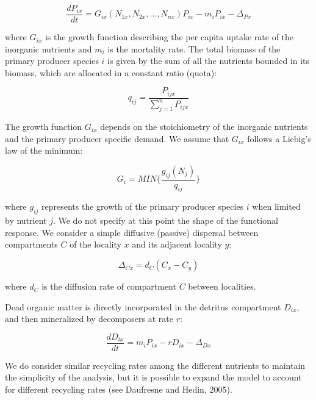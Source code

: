 \documentclass[letterpaper,twocolumn,showkeys]{revtex4-1}
\begin{document}
\begin{equation}
	\label{e:bnet}
	\frac{dP_{ix}}{dt}=G_{ix}(N_{1x},N_{2x},…,N_{nx})P_{ix}-m_{i}P_{ix}-\Delta_{Px}
\end{equation}

where $G_{ix}$ is the growth function describing the per capita uptake rate of the inorganic nutrients and $m_{i}$ is the mortality rate. The total biomass of the primary producer species $i$ is given by the sum of all the nutrients bounded in its biomass, which are allocated in a constant ratio (quota): 

\begin{equation}
	\label{e:bnet}
	q_{ij}=\frac{P_{ijx}}{\sum_{j=1}^{n}P_{ijx}}
\end{equation}

The growth function $G_{ix}$ depends on the stoichiometry of the inorganic nutrients and the primary producer specific demand. We assume that $G_{ix}$ follows a Liebig’s law of the minimum:

\begin{equation}
	\label{e:bnet}
	G_{i}=MIN\{\frac{g_{ij}(N_{j})}{q_{ij}}\}
\end{equation}

where $g_{ij}$ represents the growth of the primary producer species $i$ when limited by nutrient $j$. We do not specify at this point the shape of the functional response. We consider a simple diffusive (passive) dispersal between compartments $C$ of the locality $x$ and its adjacent locality $y$: 

\begin{equation}
	\label{e:bnet}
	\Delta_{Cx}=d_{C}(C_{x}-C_{y})
\end{equation}

where $d_{C}$ is the diffusion rate of compartment $C$ between localities.  

Dead organic matter is directly incorporated in the detritus compartment $D_{ix}$, and then mineralized by decomposers at rate $r$:

\begin{equation}
	\label{e:bnet}
	\frac{dD_{ix}}{dt}=m_{i}P_{ix}-rD_{ix}-\Delta_{Dx}
\end{equation}

We do consider similar recycling rates among the different nutrients to maintain the simplicity of the analysis, but it is possible to expand the model to account for different recycling rates (see Daufresne and Hedin, 2005). 
\end{document}
